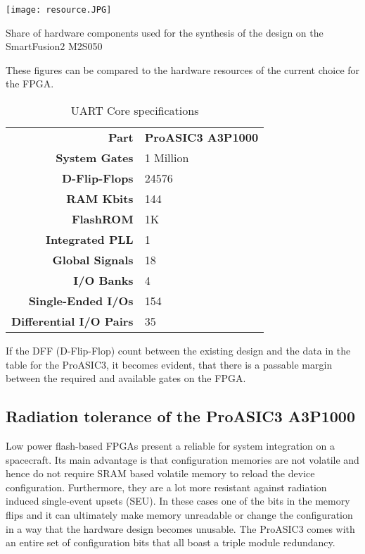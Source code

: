 \begin{table}[H]
	\centering
    \texttt{[image: resource.JPG]}
    \caption[Components]{Share of hardware components used for the synthesis of the design on the SmartFusion2 M2S050}
	\label{tab:resource}
\end{table}

These figures can be compared to the hardware resources of the current choice for the FPGA.

\begin{table}[H]

\caption[]{UART Core specifications \cite{Actel}}
    \label{tab:11}
    
  \begin{center}  
  \begin{tabular}{|r|l|}
  \hline
  \textbf{Part}  & \textbf{ProASIC3 A3P1000} \\ \cline{1-2}
  
  \textbf{System Gates} & 1 Million \\
  \textbf{D-Flip-Flops} & 24576\\ 
  \textbf{RAM Kbits} & 144 \\
  \textbf{FlashROM} & 1K\\
  \textbf{Integrated PLL} & 1 \\
  \textbf{Global Signals} & 18 \\
  \textbf{I/O Banks} & 4 \\
  \textbf{Single-Ended I/Os} & 154 \\
  \textbf{Differential I/O Pairs} & 35 \\
  \hline
  
\end{tabular}
\end{center}
\end{table}

If the DFF (D-Flip-Flop) count between the existing design and the data in the table for the ProASIC3, it becomes evident, that there is a passable margin between the required and available gates on the FPGA.


\subsection{Radiation tolerance of the ProASIC3 A3P1000}

Low power flash-based FPGAs present a reliable for system integration on a spacecraft. Its main advantage is that configuration memories are not volatile and hence do not require SRAM based volatile memory to reload the device configuration. Furthermore, they are a lot more resistant against radiation induced single-event upsets (SEU). In these cases one of the bits in the memory flips and it can ultimately make memory unreadable or change the configuration in a way that the hardware design becomes unusable. 
The ProASIC3 comes with an entire set of configuration bits that all boast a triple module redundancy. 
\newline

